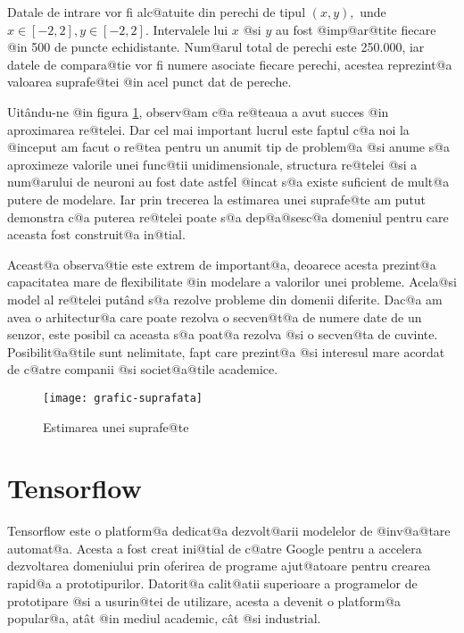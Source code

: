 Datale de intrare vor fi alc@atuite din perechi de tipul $(x, y),$ unde $x \in [-2, 2], y \in [-2, 2]$. Intervalele lui $x$ @si $y$ au fost @imp@ar@tite fiecare @in 500 de puncte echidistante. Num@arul total de perechi este 250.000, iar datele de compara@tie vor fi numere asociate fiecare perechi, acestea reprezint@a valoarea suprafe@tei @in acel punct dat de pereche. 


Uit\^ andu-ne @in figura \ref{fig:grafic-suprafata}, observ@am c@a re@teaua a avut succes @in aproximarea re@telei. Dar cel mai important lucrul este faptul c@a noi la @inceput am facut o re@tea pentru un anumit tip de problem@a @si anume s@a aproximeze valorile unei func@tii unidimensionale, structura re@telei @si a num@arului de neuroni au fost date astfel @incat s@a existe suficient de mult@a putere de modelare. Iar prin trecerea la estimarea unei suprafe@te am putut demonstra c@a puterea re@telei poate s@a dep@a@sesc@a domeniul pentru care aceasta fost construit@a in@tial.



Aceast@a observa@tie este extrem de important@a, deoarece acesta prezint@a capacitatea mare de flexibilitate @in modelare a valorilor unei probleme. Acela@si model al re@telei put\^ and s@a rezolve probleme din domenii diferite. Dac@a am avea o arhitectur@a care poate rezolva o secven@t@a
 de numere date de un senzor, este posibil ca aceasta s@a poat@a rezolva @si o secven@ta de cuvinte. Posibilit@a@tile sunt nelimitate, fapt care prezint@a @si interesul mare acordat de c@atre companii @si societ@a@tile academice.

\begin{figure}[H]
	\centering
	\texttt{[image: grafic-suprafata]}
	\caption{Estimarea unei suprafe@te}
	\label{fig:grafic-suprafata}
\end{figure}



\section{Tensorflow}

Tensorflow este o platform@a dedicat@a dezvolt@arii modelelor de @inv@a@tare automat@a. Acesta a fost creat ini@tial de c@atre Google pentru a accelera dezvoltarea domeniului prin oferirea de programe ajut@atoare pentru crearea rapid@a a prototipurilor. Datorit@a calit@atii superioare a programelor de prototipare @si a usurin@tei de utilizare, acesta a devenit o platform@a popular@a, at\^ at @in mediul academic, c\^ at @si industrial.

